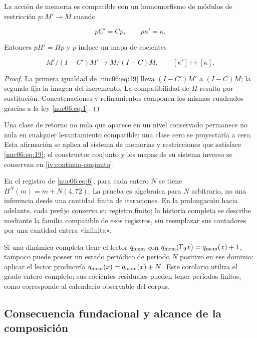 La acción de memoria es compatible con un homomorfismo de módulos de restricción \(p:M'\to M\) cuando

\begin{equation}
pC'=Cp,\qquad p\kappa'=\kappa.
\label{nuc06:eq:19}
\end{equation}

Entonces \(pH'=Hp\) y \(p\) induce un mapa de cocientes

\begin{equation}
M'/(I-C')M'\longrightarrow M/(I-C)M,
\qquad [\kappa']\longmapsto[\kappa].
\label{nuc06:eq:20}
\end{equation}

\begin{proof}
La primera igualdad de \eqref{nuc06:eq:19} lleva \((I-C')M'\) a \((I-C)M\); la segunda fija la imagen del incremento. La compatibilidad de \(H\) resulta por sustitución. Concatenaciones y refinamientos componen los mismos cuadrados gracias a la ley \eqref{nuc06:eq:1}.
\end{proof}

Una clase de retorno no nula que aparece en un nivel conservado permanece no nula en cualquier levantamiento compatible: una clase cero se proyectaría a cero. Esta afirmación se aplica al sistema de memorias y restricciones que satisface \eqref{nuc06:eq:19}; el constructor conjunto y los mapas de su sistema inverso se conservan en \cref{iv:continuo-conjunto}.

En el registro de \eqref{nuc06:eq:6}, para cada entero \(N\) se tiene \(H^N(m)=m+N(4,72)\). La prueba es algebraica para \(N\) arbitrario, no una inferencia desde una cantidad finita de iteraciones. En la prolongación hacia adelante, cada prefijo conserva su registro finito; la historia completa se describe mediante la familia compatible de esos registros, sin reemplazar sus contadores por una cantidad entera «infinita».

Si una dinámica completa tiene el lector \(q_{\rm mem}\) con \(q_{\rm mem}(\Gamma_9x)=q_{\rm mem}(x)+1\), tampoco puede poseer un estado periódico de período \(N\) positivo en ese dominio: aplicar el lector produciría \(q_{\rm mem}(x)=q_{\rm mem}(x)+N\). Este corolario utiliza el grado entero completo; sus cocientes residuales pueden tener períodos finitos, como corresponde al calendario observable del corpus.

\subsection{Consecuencia fundacional y alcance de la composición}

